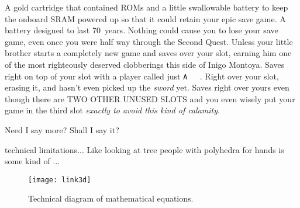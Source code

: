 \documentclass[twocolumn]{article}
\begin{document}
A gold cartridge that contained ROMs and a little swallowable battery to keep the onboard SRAM powered up so that it could retain your epic save game. A battery designed to last 70~years. Nothing could cause you to lose your save game, even once you were half way through the Second Quest. Unless your little brother starts a completely new game and saves over your slot, earning him one of the most righteously deserved clobberings this side of Inigo Montoya. Saves right on top of your slot with a player called just \verb+A   +. Right over your slot, erasing it, and hasn't even picked up the {\it sword} yet. Saves right over yours even though there are TWO OTHER UNUSED SLOTS and you even wisely put your game in the third slot {\it exactly to avoid this kind of calamity}. 

Need I say more? Shall I say it?


technical limitations...
Like looking at tree people with polyhedra for hands is some kind of ...

\begin{figure*}[p]
\begin{center}
\texttt{[image: link3d]}
\end{center}\vspace{-0.1in}
\caption{Technical diagram of mathematical equations.} \label{figure:link3d}
\smallskip
\end{figure*}

\nocite{murphy2013first}



\end{document}
